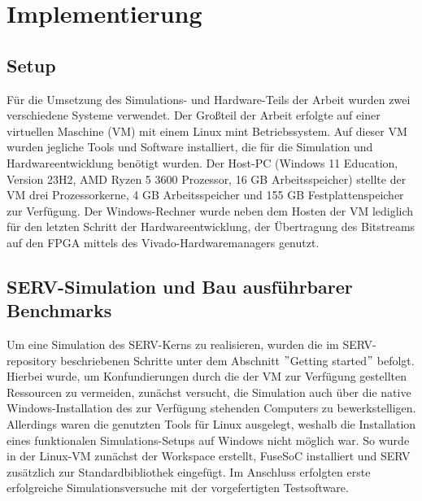\chapter{Implementierung} %

\section{Setup}
    Für die Umsetzung des Simulations- und Hardware-Teils der Arbeit wurden zwei verschiedene Systeme verwendet.
    Der Großteil der Arbeit erfolgte auf einer virtuellen Maschine (VM) mit einem Linux mint Betriebssystem.
    Auf dieser VM wurden jegliche Tools und Software installiert, die für die Simulation und Hardwareentwicklung benötigt wurden.
    Der Host-PC (Windows 11 Education, Version 23H2, AMD Ryzen 5 3600 Prozessor, 16 GB Arbeitsspeicher) stellte der VM drei Prozessorkerne, 4 GB Arbeitsspeicher und 155 GB Festplattenspeicher zur Verfügung.
    Der Windows-Rechner wurde neben dem Hosten der VM lediglich für den letzten Schritt der Hardwareentwicklung, der Übertragung des Bitstreams auf den FPGA mittels des Vivado-Hardwaremanagers genutzt.

\section{SERV-Simulation und Bau ausführbarer Benchmarks} \label{Bau ausführbarer Benchmarks}
    Um eine Simulation des SERV-Kerns zu realisieren, wurden die im SERV-repository \parencite{kindgren_serv} beschriebenen Schritte unter dem Abschnitt \("\)Getting started\("\) befolgt.
    Hierbei wurde, um Konfundierungen durch die der VM zur Verfügung gestellten Ressourcen zu vermeiden, zunächst versucht, die Simulation auch über die native Windows-Installation des zur Verfügung stehenden Computers zu bewerkstelligen.
    Allerdings waren die genutzten Tools für Linux ausgelegt, weshalb die Installation eines funktionalen Simulations-Setups auf Windows nicht möglich war.
    So wurde in der Linux-VM zunächst der Workspace erstellt, FuseSoC installiert und SERV zusätzlich zur Standardbibliothek eingefügt.
    Im Anschluss erfolgten erste erfolgreiche Simulationsversuche mit der vorgefertigten Testsoftware.

